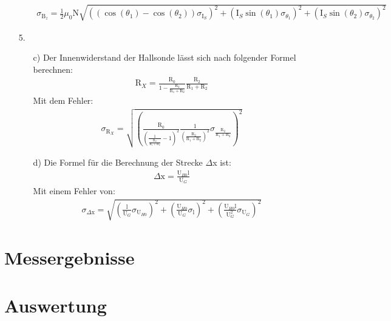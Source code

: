 \documentclass[12pt]{scrartcl}
\begin{document}
\begin{enumerate}
\begin{enumerate}
\begin{align}
\sigma_{\text{B}_z} = \frac{1}{2} \mu_0 \text{N}
\sqrt{\left((\cos(\theta_1) - \cos(\theta_2)) \sigma_{\text{I}_S}\right)^2+
\left(\text{I}_S \sin(\theta_1) \sigma_{\theta_1}\right)^2+
\left(\text{I}_S \sin(\theta_2) \sigma_{\theta_2}\right)^2}
\label{eqn:aufgabe_3_sigma}
\end{align}
\end{enumerate}
\item[5.]
\begin{enumerate}
\item[c)] Der Innenwiderstand der Hallsonde lässt sich nach folgender Formel berechnen:
\begin{align}
\text{R}_X = \frac{\text{R}_0}{1-\frac{\text{R}_2}{\text{R}_1+\text{R}_2}}\frac{\text{R}_2}{\text{R}_1+\text{R}_2}
\label{eqn:innen_widerstand}
\end{align}
Mit dem Fehler:
\begin{align}
\sigma_{\text{R}_X} = \sqrt{\left(\frac{\text{R}_0}{\left(\frac{1}{\frac{\text{R}_2}{\text{R}_1+\text{R}_2}}-1\right)^2}\frac{1}{\left(\frac{\text{R}_2}{\text{R}_1+
\text{R}_2}\right)^2}\sigma_{\frac{\text{R}_2}{\text{R}_1+\text{R}_2}}\right)^2}
\label{eqn:innen_widerstand_sigma}
\end{align}

\item[d)]
Die Formel für die Berechnung der Strecke $\Delta$x ist:
\begin{align}
\Delta \text{x} = \frac{\text{U}_{H0}\text{l}}{\text{U}_G}
\label{eqn:delta}
\end{align}
Mit einem Fehler von:
\begin{align}
\sigma_{\Delta \text{x}} = \sqrt{
\left(\frac{\text{l}}{\text{U}_G}\sigma_{\text{U}_{H0}}\right)^2+
\left(\frac{\text{U}_{H0}}{\text{U}_G}\sigma_{\text{l}}\right)^2+
\left(\frac{\text{U}_{H0}\text{l}}{\text{U}_G^2}\sigma_{\text{U}_G}\right)^2}
\label{eqn:delta_sigma}
\end{align}
\end{enumerate}

\end{enumerate}

\section{Messergebnisse}



\section{Auswertung}
\end{document}
